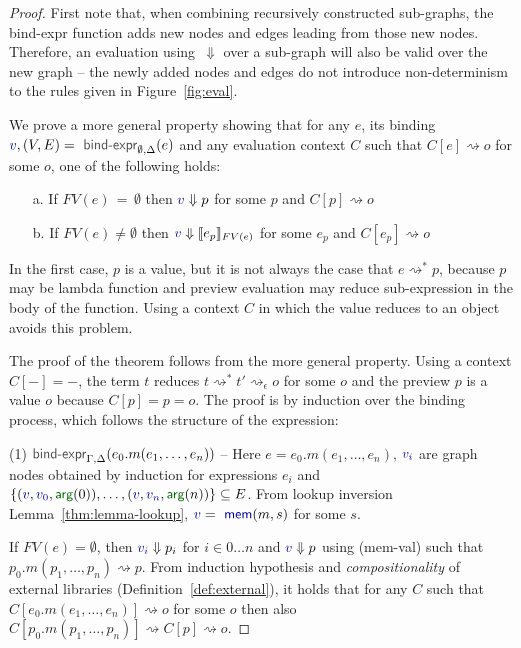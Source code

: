 \documentclass[acmsmall,anonymous,fleqn]{acmart}\settopmatter{printfolios=false,printccs=false,printacmref=false}
\theoremstyle{plain}
\theoremstyle{definition}
\newcommand{\ident}[1]{\textnormal{\textcolor{idclr}{\sffamily #1}}}
\newcommand{\bndclr}[1]{\textcolor{kvdclr}{#1}}
\newcommand{\bnd}[1]{\textnormal{\textcolor{kvdclr}{\sffamily #1}}}
\newcommand{\blbl}[1]{\textnormal{\textcolor{numclr}{\sffamily #1}}}
\newcommand{\rname}[1]{{\sffamily\small(#1)}}
\begin{document}
\begin{proof}
First note that, when combining recursively constructed sub-graphs, the \ident{bind-expr} function
adds new nodes and edges leading from those new nodes. Therefore, an evaluation using~$\Downarrow$
over a sub-graph will also be valid over the new graph -- the newly added nodes and edges do not introduce
non-determinism to the rules given in Figure~\ref{fig:eval}.

We prove a more general property showing that for any $e$, its binding
$\bndclr{v}, (V, E) = \ident{bind-expr}_{\emptyset, \Delta}(e)$ and any evaluation context $C$
such that $C[e]\rightsquigarrow o$ for some $o$, one of the following holds:
%
\begin{enumerate}
\item[a.] If $FV(e)\,=\,\emptyset$ then $\bndclr{v} \Downarrow p$ for some $p$ and $C[p] \rightsquigarrow o$
\item[b.] If $FV(e)\neq\emptyset$ then $\bndclr{v} \Downarrow \llbracket e_p \rrbracket_{FV(e)}$ for some $e_p$ and $C[e_p] \rightsquigarrow o$
\end{enumerate}
%
In the first case, $p$ is a value, but it is not always the case that $e \rightsquigarrow^{*} p$,
because $p$ may be lambda function and preview evaluation may reduce sub-expression in the body of
the function. Using a context $C$ in which the value reduces to an object avoids this problem.

The proof of the theorem follows from the more general property. Using a context $C[-]=-$, the
term $t$ reduces $t \rightsquigarrow^{*}t' \rightsquigarrow_\epsilon o$ for some $o$ and the
preview $p$ is a value $o$ because $C[p] = p = o$.
The proof is by induction over the binding process, which follows the structure of the expression:

\vspace{0.75em}\noindent(1) $\ident{bind-expr}_{\Gamma, \Delta}(e_0.m(e_1, \ldots, e_n))$ --
  Here $e = e_0.m(e_1, \ldots, e_n)$, $\bndclr{v_i}$ are graph nodes obtained by induction for
  expressions $e_i$ and $\{ (\bndclr{v}, \bndclr{v_0}, \blbl{arg}(0)), \ldots, (\bndclr{v}, \bndclr{v_n}, \blbl{arg}(n))\} \subseteq E$.
  From lookup inversion Lemma~\ref{thm:lemma-lookup}, $\bndclr{v} = \bnd{mem}(m, s)$ for some $s$.

  If $FV(e)=\emptyset$, then $\bndclr{v_i} \Downarrow p_i$ for $i\in 0\ldots n$ and
  $\bndclr{v}\Downarrow p$ using \rname{mem-val} such that $p_0.m(p_1, \ldots, p_n) \rightsquigarrow p$.
  From induction hypothesis and \emph{compositionality} of external libraries (Definition~\ref{def:external}),
  it holds that for any $C$ such that $C[e_0.m(e_1, \ldots, e_n)] \rightsquigarrow o$ for some $o$
  then also $C[p_0.m(p_1, \ldots, p_n)] \rightsquigarrow C[p] \rightsquigarrow o$.


\end{proof}
\end{document}
